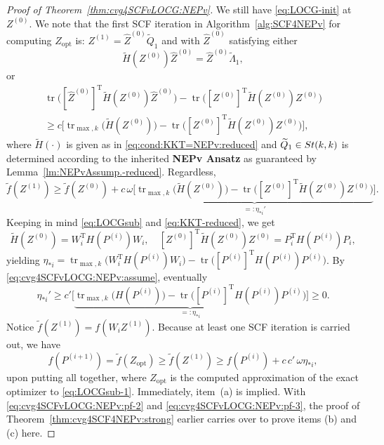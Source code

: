 \documentclass[11pt]{article}
\def\wtd{\widetilde}
\def\what{\widehat}
\newcommand\STM[2]{{\rm St}(#1,#2)}
\DeclareMathOperator*{\opt}{opt}
\DeclareMathOperator{\tr}{tr}
\DeclareMathOperator{\T}{T}
\theoremstyle{definition}
\numberwithin{equation}{section}
\begin{document}
\begin{proof}[Proof of Theorem~\ref{thm:cvg4SCFvLOCG:NEPv}]
We still have \eqref{eq:LOCG-init} at $Z^{(0)}$.
We note that the first SCF iteration in Algorithm~\ref{alg:SCF4NEPv} for computing $Z_{\opt}$ is:
$Z^{(1)}=\what Z^{(0)}\wtd Q_1$ and with $\what Z^{(0)}$ satisfying
either
\begin{equation}\label{eq:cvg4SCFvLOCG:NEPv:pf-0}
\wtd H(Z^{(0)})\what Z^{(0)}=\what Z^{(0)}\wtd\Lambda_1,
\end{equation}
or
\begin{multline*}
\tr\big([\what Z^{(0)}]^{\T}\wtd H(Z^{(0)})\what Z^{(0)}\big)-\tr\big([Z^{(0)}]^{\T}\wtd H(Z^{(0)}) Z^{(0)}\big) \\
   \ge c\Big[\tr_{\max,k}\big(\wtd H(Z^{(0)})\big)-\tr\big([Z^{(0)}]^{\T}\wtd H(Z^{(0)}) Z^{(0)}\big)\Big],
\end{multline*}
where $\wtd H(\cdot)$ is given as in \eqref{eq:cond:KKT=NEPv:reduced} and $\wtd Q_1\in\STM{k}{k}$ is
determined according to the inherited {\bf NEPv Ansatz} as guaranteed by Lemma~\ref{lm:NEPvAssump.-reduced}.
Regardless,
\begin{equation}\label{eq:cvg4SCFvLOCG:NEPv:pf-1}
\wtd f(Z^{(1)})
  \ge\wtd f(Z^{(0)})
    +c\,\omega\Big[\underbrace{\tr_{\max,k}\big(\wtd H(Z^{(0)})\big)
       -\tr\big([Z^{(0)}]^{\T}\wtd H(Z^{(0)}) Z^{(0)}\big)}_{=:\eta_{*i}'}\Big].
\end{equation}
Keeping in mind \eqref{eq:LOCGsub} and \eqref{eq:KKT-reduced}, we get
$$
\wtd H(Z^{(0)})=W_i^{\T}H(P^{(i)})W_i, \quad
[Z^{(0)}]^{\T}\wtd H(Z^{(0)}) Z^{(0)}=P_i^{\T}H(P^{(i)})P_i,
$$
yielding $\eta_{*i}=\tr_{\max,k}\big(W_i^{\T}H(P^{(i)})W_i\big)-\tr\big([P^{(i)}]^{\T}H(P^{(i)})P^{(i)}\big)$.
By \eqref{eq:cvg4SCFvLOCG:NEPv:assume}, eventually
\begin{equation}\label{eq:cvg4SCFvLOCG:NEPv:pf-2}
\eta_{*i}'\ge c'\Big[\underbrace{\tr_{\max,k}\big(H(P^{(i)})\big)-\tr\big([P^{(i)}]^{\T}H(P^{(i)})P^{(i)}\big)}_{=:\eta_{*i}}\Big]\ge 0.
\end{equation}
Notice $\wtd f(Z^{(1)})=f(W_iZ^{(1)})$. Because at least one SCF iteration is carried out, we have
\begin{equation}\label{eq:cvg4SCFvLOCG:NEPv:pf-3}
f(P^{(i+1)})=\wtd f(Z_{\opt})\ge \wtd f(Z^{(1)})\ge f(P^{(i)})+c\,c'\,\omega\eta_{*i},
\end{equation}
upon putting all together, where $Z_{\opt}$ is the computed approximation of the exact optimizer to \eqref{eq:LOCGsub-1}.
Immediately, item~(a) is implied.
With \eqref{eq:cvg4SCFvLOCG:NEPv:pf-2} and \eqref{eq:cvg4SCFvLOCG:NEPv:pf-3},
the proof of Theorem~\ref{thm:cvg4SCF4NEPv:strong} earlier
carries over to prove items (b) and (c) here.
\end{proof}
\end{document}
